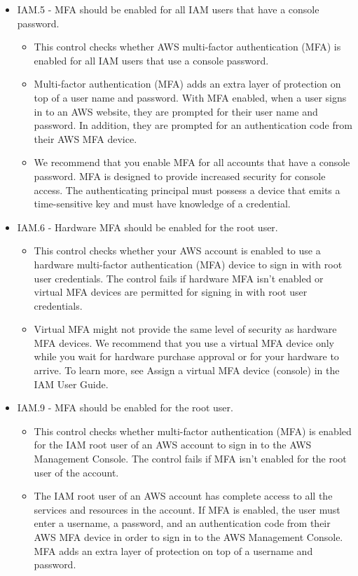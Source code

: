 \begin{mdframed}[backgroundcolor=gray!05, linecolor=gray!50]
\begin{itemize}
\begin{itemize}
    \end{itemize}
    \item IAM.5 - MFA should be enabled for all IAM users that have a console password.
    \begin{itemize}
        \item This control checks whether AWS multi-factor authentication (MFA) is enabled for all IAM users that use a console password.
        \item Multi-factor authentication (MFA) adds an extra layer of protection on top of a user name and password. With MFA enabled, when a user signs in to an AWS website, they are prompted for their user name and password. In addition, they are prompted for an authentication code from their AWS MFA device. 
        \item We recommend that you enable MFA for all accounts that have a console password. MFA is designed to provide increased security for console access. The authenticating principal must possess a device that emits a time-sensitive key and must have knowledge of a credential.
    \end{itemize}
    \item IAM.6 - Hardware MFA should be enabled for the root user.
    \begin{itemize}
        \item This control checks whether your AWS account is enabled to use a hardware multi-factor authentication (MFA) device to sign in with root user credentials. The control fails if hardware MFA isn't enabled or virtual MFA devices are permitted for signing in with root user credentials.
        \item Virtual MFA might not provide the same level of security as hardware MFA devices. We recommend that you use a virtual MFA device only while you wait for hardware purchase approval or for your hardware to arrive. To learn more, see Assign a virtual MFA device (console) in the IAM User Guide.
    \end{itemize}
    \item IAM.9 - MFA should be enabled for the root user.
    \begin{itemize}
        \item This control checks whether multi-factor authentication (MFA) is enabled for the IAM root user of an AWS account to sign in to the AWS Management Console. The control fails if MFA isn't enabled for the root user of the account.
        \item The IAM root user of an AWS account has complete access to all the services and resources in the account. If MFA is enabled, the user must enter a username, a password, and an authentication code from their AWS MFA device in order to sign in to the AWS Management Console. MFA adds an extra layer of protection on top of a username and password.

\end{itemize}
\end{itemize}
\end{mdframed}
